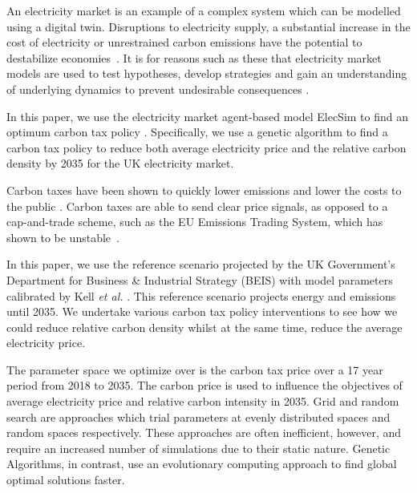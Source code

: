 
An electricity market is an example of a complex system which can be modelled using a digital twin. Disruptions to electricity supply, a substantial increase in the cost of electricity or unrestrained carbon emissions have the potential to destabilize economies~\cite{Kaseke2013,Masson-Delmotte2018}. It is for reasons such as these that electricity market models are used to test hypotheses, develop strategies and gain an understanding of underlying dynamics to prevent undesirable consequences \cite{Jebaraj2006}. 

In this paper, we use the electricity market agent-based model ElecSim to find an optimum carbon tax policy \cite{Kell}. Specifically, we use a genetic algorithm to find a carbon tax policy to reduce both average electricity price and the relative carbon density by 2035 for the UK electricity market. 

Carbon taxes have been shown to quickly lower emissions and lower the costs to the public \cite{Wittneben2009}. Carbon taxes are able to send clear price signals, as opposed to a cap-and-trade scheme, such as the EU Emissions Trading System, which has shown to be unstable~\cite{Wittneben2009}.

In this paper, we use the reference scenario projected by the UK Government's Department for Business \& Industrial Strategy (BEIS) with model parameters calibrated by Kell \textit{et al.} \cite{DBEIS2019,Kell2020}. This reference scenario projects energy and emissions until 2035. We undertake various carbon tax policy interventions to see how we could reduce relative carbon density whilst at the same time, reduce the average electricity price.


The parameter space we optimize over is the carbon tax price over a 17 year period from 2018 to 2035. The carbon price is used to influence the objectives of average electricity price and relative carbon intensity in 2035. Grid and random search are approaches which trial parameters at evenly distributed spaces and random spaces respectively. These approaches are often inefficient, however, and require an increased number of simulations due to their static nature. Genetic Algorithms, in contrast, use an evolutionary computing approach to find global optimal solutions faster.


